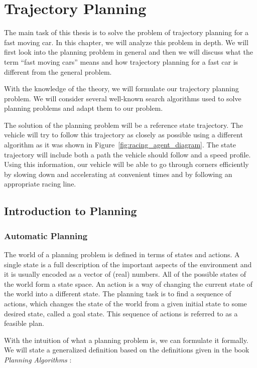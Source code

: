 \chapter{Trajectory Planning}

The main task of this thesis is to solve the problem of trajectory planning for a fast moving car. In this chapter, we will analyze this problem in depth. We will first look into the planning problem in general and then we will discuss what the term ``fast moving cars'' means and how trajectory planning for a fast car is different from the general problem.

With the knowledge of the theory, we will formulate our trajectory planning problem. We will consider several well-known search algorithms used to solve planning problems and adapt them to our problem.

The solution of the planning problem will be a reference state trajectory. The vehicle will try to follow this trajectory as closely as possible using a different algorithm as it was shown in Figure~\ref{fig:racing_agent_diagram}. The state trajectory will include both a path the vehicle should follow and a speed profile. Using this information, our vehicle will be able to go through corners efficiently by slowing down and accelerating at convenient times and by following an appropriate racing line.

\section{Introduction to Planning}

\subsection{Automatic Planning}

The world of a planning problem is defined in terms of states and actions. A single state is a full description of the important aspects of the environment and it is usually encoded as a vector of (real) numbers. All of the possible states of the world form a state space. An action is a way of changing the current state of the world into a different state. The planning task is to find a sequence of actions, which changes the state of the world from a given initial state to some desired state, called a goal state. This sequence of actions is referred to as a feasible plan.

With the intuition of what a planning problem is, we can formulate it formally. We will state a generalized definition based on the definitions given in the book \textit{Planning Algorithms} \cite{lavalle_2006}:

